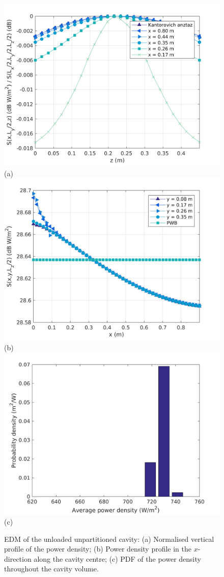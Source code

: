 \documentclass[a4paper]{article}
\numberwithin{equation}{section}
\begin{document}
\begin{figure}[ht]
\begin{center}
\includegraphics[width=0.6\linewidth]{figures/SDM_3D_SU_PowerDensityProfileZ}\\
{\footnotesize (a)}\\
\vspace{2mm}
\includegraphics[width=0.6\linewidth]{figures/SDM_3D_SU_PowerDensityProfileX}\\
{\footnotesize (b)}\\
\vspace{2mm}
\includegraphics[width=0.6\linewidth]{figures/SDM_3D_SU_PowerDensityPDF}\\
{\footnotesize (c)}\\
\vspace{-2mm}
\caption{\label{fg:unpartempty_profs} EDM of the unloaded unpartitioned cavity: (a) Normalised vertical profile of the power density; 
(b) Power density profile in the $x$-direction along the cavity centre; (c) PDF of the power density throughout the cavity volume.}
\end{center}
\end{figure}
\end{document}
